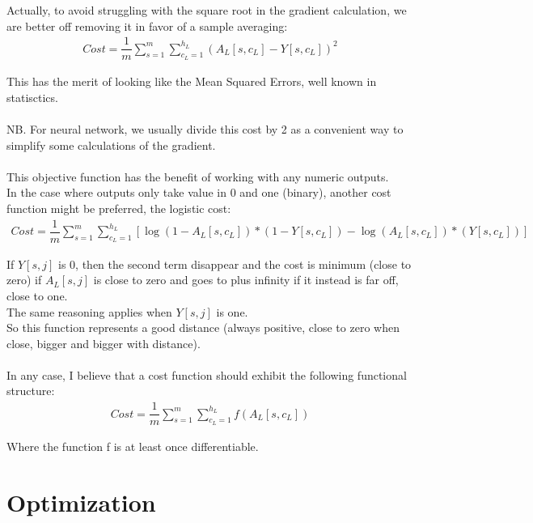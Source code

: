 \documentclass[]{article}
\begin{document}
Actually, to avoid struggling with the square root in the gradient calculation, we are better off removing it in favor of a sample averaging:\\ 

\begin{align*}
Cost= \dfrac{1}{m}  \sum_{s=1}^{m}\sum_{c_L=1}^{h_L}(A_L[s,c_L]-Y[s,c_L])^2 
\end{align*}

This has the merit of looking like the Mean Squared Errors, well known in statisctics.\\
\\
NB. For neural network, we usually divide this cost by 2 as a convenient way to simplify some calculations of the gradient.\\
\\
This objective function has the benefit of working with any numeric outputs.\\
In the case where outputs only take value in 0 and one (binary), another cost function might be preferred, the logistic cost:\\

\begin{align*}
Cost=\dfrac{1}{m}\sum_{s=1}^{m}\sum_{c_L=1}^{h_L}\left[ \log(1-A_L[s,c_L])*(1-Y[s,c_L])-\log(A_L[s,c_L])*(Y[s,c_L])\right]
\end{align*}

If $Y[s,j]$ is 0, then the second term disappear and the cost is minimum (close to zero) if $A_L[s,j]$ is close to zero and goes to plus infinity if it instead is far off, close to one.\\
The same reasoning applies when $Y[s,j]$ is one.\\
So this function represents a good distance (always positive, close to zero when close, bigger and bigger with distance).\\
\\
In any case, I believe that a cost function should exhibit the following functional structure:\\
\begin{align}
Cost=\dfrac{1}{m}\sum_{s=1}^{m}\sum_{c_L=1}^{h_L}f(A_L[s,c_L]) \label{eq:cost}
\end{align}

Where the function f is at least once differentiable.


\section{Optimization}
\end{document}

